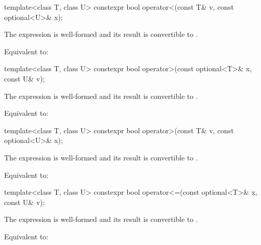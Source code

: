 %
\begin{itemdecl}
template<class T, class U> constexpr bool operator<(const T& v, const optional<U>& x);
\end{itemdecl}

\begin{itemdescr}
\pnum
\mandates
The expression  is well-formed and
its result is convertible to .

\pnum
\effects
Equivalent to: 
\end{itemdescr}

%
\begin{itemdecl}
template<class T, class U> constexpr bool operator>(const optional<T>& x, const U& v);
\end{itemdecl}

\begin{itemdescr}
\pnum
\mandates
The expression  is well-formed and
its result is convertible to .

\pnum
\effects
Equivalent to: 
\end{itemdescr}

%
\begin{itemdecl}
template<class T, class U> constexpr bool operator>(const T& v, const optional<U>& x);
\end{itemdecl}

\begin{itemdescr}
\pnum
\mandates
The expression  is well-formed and
its result is convertible to .

\pnum
\effects
Equivalent to: 
\end{itemdescr}

%
\begin{itemdecl}
template<class T, class U> constexpr bool operator<=(const optional<T>& x, const U& v);
\end{itemdecl}

\begin{itemdescr}
\pnum
\mandates
The expression  is well-formed and
its result is convertible to .

\pnum
\effects
Equivalent to: 
\end{itemdescr}

